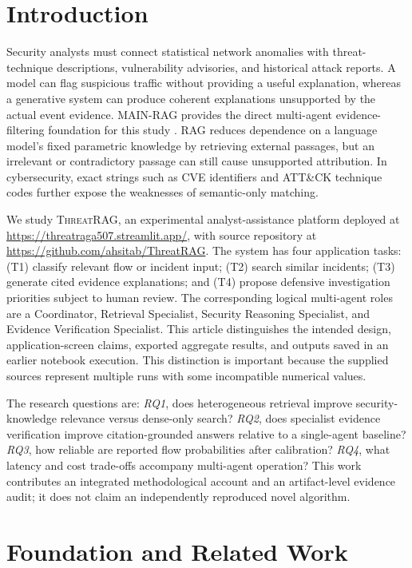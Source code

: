 \documentclass[journal,twoside]{IEEEtran}
\newcommand{\TR}{\textsc{ThreatRAG}}
\begin{document}
\section{Introduction}
Security analysts must connect statistical network anomalies with threat-technique descriptions, vulnerability advisories, and historical attack reports. A model can flag suspicious traffic without providing a useful explanation, whereas a generative system can produce coherent explanations unsupported by the actual event evidence. MAIN-RAG provides the direct multi-agent evidence-filtering foundation for this study \cite{mainrag}. RAG reduces dependence on a language model's fixed parametric knowledge by retrieving external passages, but an irrelevant or contradictory passage can still cause unsupported attribution. In cybersecurity, exact strings such as CVE identifiers and ATT\&CK technique codes further expose the weaknesses of semantic-only matching.

We study \TR, an experimental analyst-assistance platform deployed at \url{https://threatraga507.streamlit.app/}, with source repository at \url{https://github.com/ahsitab/ThreatRAG}. The system has four application tasks: (T1) classify relevant flow or incident input; (T2) search similar incidents; (T3) generate cited evidence explanations; and (T4) propose defensive investigation priorities subject to human review. The corresponding logical multi-agent roles are a Coordinator, Retrieval Specialist, Security Reasoning Specialist, and Evidence Verification Specialist. This article distinguishes the intended design, application-screen claims, exported aggregate results, and outputs saved in an earlier notebook execution. This distinction is important because the supplied sources represent multiple runs with some incompatible numerical values.

The research questions are: \emph{RQ1}, does heterogeneous retrieval improve security-knowledge relevance versus dense-only search? \emph{RQ2}, does specialist evidence verification improve citation-grounded answers relative to a single-agent baseline? \emph{RQ3}, how reliable are reported flow probabilities after calibration? \emph{RQ4}, what latency and cost trade-offs accompany multi-agent operation? This work contributes an integrated methodological account and an artifact-level evidence audit; it does not claim an independently reproduced novel algorithm.

\section{Foundation and Related Work}
\end{document}
